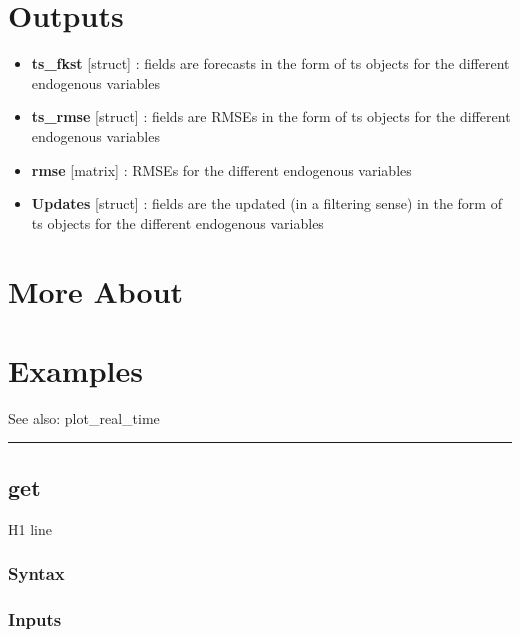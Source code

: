 \documentclass[letterpaper,10pt,english]{sphinxmanual}
\begin{document}
\section{Outputs}
\label{classes/models/@dsge/dsge:id49}\begin{itemize}
\item {} 
\textbf{ts\_fkst} {[}struct{]} : fields are forecasts in the form of ts objects
for the different endogenous variables

\item {} 
\textbf{ts\_rmse} {[}struct{]} : fields are RMSEs in the form of ts objects
for the different endogenous variables

\item {} 
\textbf{rmse} {[}matrix{]} : RMSEs for the different endogenous variables

\item {} 
\textbf{Updates} {[}struct{]} : fields are the updated (in a filtering sense) in
the form of ts objects for the different endogenous variables

\end{itemize}


\section{More About}
\label{classes/models/@dsge/dsge:id50}

\section{Examples}
\label{classes/models/@dsge/dsge:id51}
See also: plot\_real\_time


\bigskip\hrule{}\bigskip



\subsection{get}
\label{classes/models/@dsge/dsge:id52}\label{classes/models/@dsge/dsge:get}
H1 line


\subsubsection{Syntax}
\label{classes/models/@dsge/dsge:id53}

\subsubsection{Inputs}
\label{classes/models/@dsge/dsge:id54}
\end{document}
